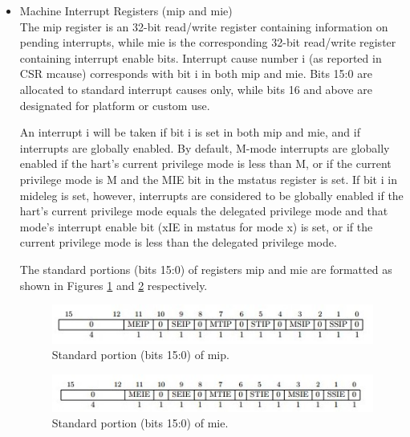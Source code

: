 \documentclass[../main.tex]{subfiles}
\begin{document}
\begin{itemize}
\begin{itemize}
            \item Machine Interrupt Registers (mip and mie)\\
            The mip register is an 32-bit read/write register containing information on pending interrupts,
            while mie is the corresponding 32-bit read/write register containing interrupt enable bits.
            Interrupt cause number i (as reported in CSR mcause) corresponds with bit i in
            both mip and mie. Bits 15:0 are allocated to standard interrupt causes only, while bits 16 and
            above are designated for platform or custom use.
            
            An interrupt i will be taken if bit i is set in both mip and mie, and if interrupts are globally enabled.
            By default, M-mode interrupts are globally enabled if the hart’s current privilege mode is less than
            M, or if the current privilege mode is M and the MIE bit in the mstatus register is set. If bit i
            in mideleg is set, however, interrupts are considered to be globally enabled if the hart’s current
            privilege mode equals the delegated privilege mode and that mode’s interrupt enable bit (xIE in
            mstatus for mode x) is set, or if the current privilege mode is less than the delegated privilege mode.

            The standard portions (bits 15:0) of registers mip and mie are formatted as shown in Figures \ref{fig:mip}
            and \ref{fig:mie} respectively.
            \begin{figure}[h]
            \centering
            \includegraphics[width=12 cm]{diagrams/mip.jpg}
            \caption{Standard portion (bits 15:0) of mip.}
            \label{fig:mip}
            \end{figure}
            \begin{figure}[h]
            \centering
            \includegraphics[width=12 cm]{diagrams/mie.jpg}
            \caption{Standard portion (bits 15:0) of mie.}
            \label{fig:mie}
            \end{figure}
            

\end{itemize}
\end{itemize}
\end{document}
